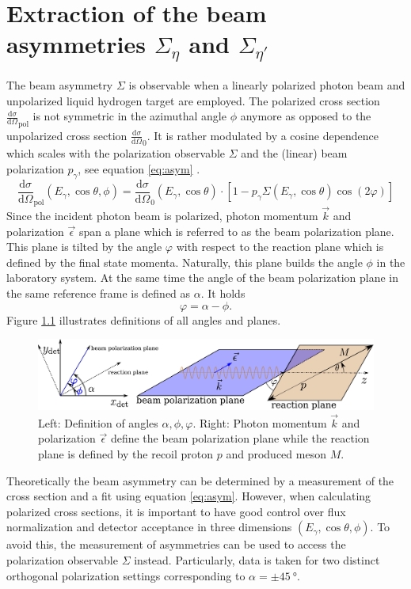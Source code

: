 
\chapter{Extraction of the beam asymmetries $\Sigma_{\eta}$ and $\Sigma_{\eta'}$}
The beam asymmetry $\Sigma$ is observable when a linearly polarized photon beam and unpolarized liquid hydrogen target are employed. The polarized cross section $\frac{\text{d}\sigma}{\text{d}\Omega}_\text{pol}$ is not symmetric in the azimuthal angle $\phi$ anymore as opposed to the unpolarized cross section $\frac{\text{d}\sigma}{\text{d}\Omega}_0$. It is rather modulated by a cosine dependence which scales with the polarization observable $\Sigma$ and the (linear) beam polarization $p_\gamma$, see equation \eqref{eq:asym} \cite{san}.
\begin{equation}
	\frac{\text{d}\sigma}{\text{d}\Omega}_\text{pol}\left(E_\gamma,\cos\theta,\phi\right)=\frac{\text{d}\sigma}{\text{d}\Omega}_0\left(E_\gamma,\cos\theta\right)\cdot\left[1-p_\gamma\Sigma\left(E_\gamma,\cos\theta\right)\cos\left(2\varphi\right)\right]
	\label{eq:asym}
\end{equation}
Since the incident photon beam is polarized, photon momentum $\vec{k}$ and polarization $\vec{\epsilon}$ span a plane which is referred to as the beam polarization plane. This plane is tilted by the angle $\varphi$ with respect to the reaction plane which is defined by the final state momenta. Naturally, this plane builds the angle $\phi$ in the laboratory system. At the same time the angle of the beam polarization plane in the same reference frame is defined as $\alpha$. It holds 
\begin{equation}
	\varphi=\alpha-\phi.
\end{equation} Figure \ref{fig:angles} illustrates definitions of all angles and planes. 
 \begin{figure}[htbp]
	\centering
	\includegraphics[width=\linewidth]{../DPG2022/figs/angles.pdf}
	\caption{Left: Definition of angles $\alpha,\phi,\varphi$. Right: Photon momentum $\vec{k}$ and polarization  $\vec{\epsilon}$ define the beam polarization plane while the reaction plane is defined by the recoil proton $p$ and produced meson $M$.}
	\label{fig:angles}
\end{figure} 
Theoretically the beam asymmetry can be determined by a measurement of the cross section and a fit using equation \eqref{eq:asym}. However, when calculating polarized cross sections, it is important to have good control over flux normalization and detector acceptance in three dimensions $(E_\gamma,\cos\theta,\phi)$. To avoid this, the measurement of asymmetries can be used to access the polarization observable $\Sigma$ instead. Particularly, data is taken for two distinct orthogonal polarization settings corresponding to $\alpha=\pm\SI{45}{\degree}$.

